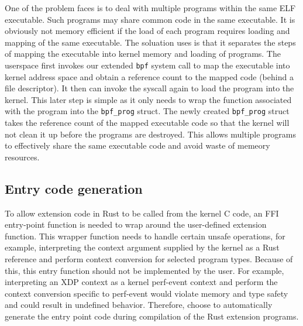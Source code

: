 One of the problem \projname{} faces is to deal with multiple programs within
    the same ELF executable.
Such programs may share common code in the same executable.
It is obviously not memory efficient if the load of each program requires
    loading and mapping of the same executable.
The soluation \projname{} uses is that it separates the steps of mapping the
    executable into kernel memory and loading of programs.
The userspace first invokes our extended \texttt{bpf} system call to map the
    executable into kernel address space and obtain a reference count to the
    mapped code (behind a file descriptor).
It then can invoke the syscall again to load the program into the kernel.
This later step is simple as it only needs to wrap the function associated with
    the \projname{} program into the \texttt{bpf\_prog} struct.
The newly created \texttt{bpf\_prog} struct takes the reference count of the
    mapped executable code so that the kernel will not clean it up before the
    programs are destroyed.
This allows multiple programs to effectively share the same executable code and
    avoid waste of memeory resources.

\subsection{Entry code generation}
To allow \projname{} extension code in Rust to be called from the kernel C
    code, an FFI entry-point function is needed to wrap around the user-defined
    extension function.
This wrapper function needs to handle certain unsafe operations, for example,
    interpreting the context argument supplied by the kernel as a Rust
    reference and perform context conversion for selected program types.
Because of this, this entry function should not be implemented by the user.
For example, interpreting an XDP context as a kernel perf-event context and
    perform the context conversion specific to perf-event would violate memory
    and type safety and could result in undefined behavior.
Therefore, \projname{} choose to automatically generate the entry point code
    during compilation of the Rust extension programs.

